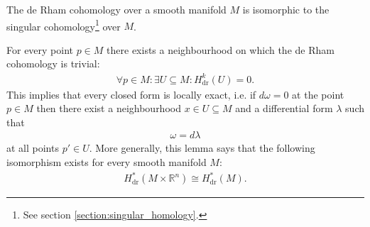 

    \begin{theorem}[de Rham]
        The de Rham cohomology over a smooth manifold $M$ is isomorphic to the singular cohomology\footnote{See section \ref{section:singular_homology}.} over $M$.
    \end{theorem}

    \begin{theorem}\label{forms:theorem:poincare}
         For every point $p\in M$ there exists a neighbourhood on which the de Rham cohomology is trivial:
        \begin{gather}
            \forall p\in M:\exists U\subseteq M: H^k_{\text{dr}}(U) = 0.
        \end{gather}
        This implies that every closed form is locally exact, i.e. if $d\omega=0$ at the point $p\in M$ then there exist a neighbourhood $x\in U\subseteq M$ and a differential form $\lambda$ such that
        \begin{gather}
            \omega = d\lambda
        \end{gather}
        at all points $p'\in U$. More generally, this lemma says that the following isomorphism exists for every smooth manifold $M$:
        \begin{gather}
            H^*_{\text{dr}}(M\times\mathbb{R}^n) \cong H^*_{\text{dr}}(M).
        \end{gather}
    \end{theorem}

